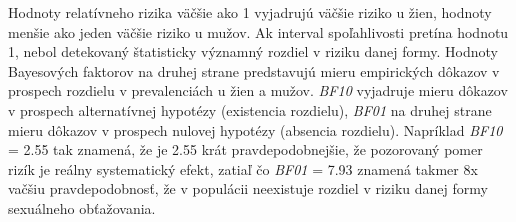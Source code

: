 \documentclass[
]{article}
\begin{document}
Hodnoty relatívneho rizika väčšie ako 1 vyjadrujú väčšie riziko u žien, hodnoty menšie ako jeden väčšie riziko u mužov. Ak interval spoľahlivosti pretína hodnotu 1, nebol detekovaný štatisticky významný rozdiel v riziku danej formy. Hodnoty Bayesových faktorov na druhej strane predstavujú mieru empirických dôkazov v prospech rozdielu v prevalenciách u žien a mužov. \emph{BF10} vyjadruje mieru dôkazov v prospech alternatívnej hypotézy (existencia rozdielu), \emph{BF01} na druhej strane mieru dôkazov v prospech nulovej hypotézy (absencia rozdielu). Napríklad \emph{BF10} = 2.55 tak znamená, že je 2.55 krát pravdepodobnejšie, že pozorovaný pomer rizík je reálny systematický efekt, zatiaľ čo \emph{BF01} = 7.93 znamená takmer 8x vačšiu pravdepodobnosť, že v populácii neexistuje rozdiel v riziku danej formy sexuálneho obťažovania.
\end{document}
